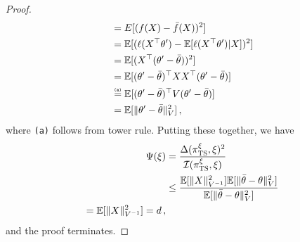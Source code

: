 \documentclass[letter, 12pt]{report}
\newcommand{\explan}[1]{\stackrel{\text{\tiny \texttt{#1}}}}
\newcommand{\E}{\mathbb E}
\newcommand{\I}{\mathcal{I}}
\newcommand{\1}{\mathbf{1}}
\newcommand{\ts}{\textsc{TS}\xspace}
\theoremstyle{plain}
\theoremstyle{definition}
\theoremstyle{remark}
\begin{document}
\begin{proof}
\begin{align*}
         & =
        E[(f(X) - \bar{f}(X))^2]                                            \\
         & =
        \E[(\ell(X^\top \theta') - \E[\ell(X^\top \theta')|X])^2]           \\
         & =
        \E[(X^\top (\theta' - \bar{\theta}))^2]                             \\
         & =
        \E[(\theta' - \bar{\theta})^\top X X^\top (\theta' - \bar{\theta})] \\
         &
        \explan{(a)}
        =
        \E[(\theta' - \bar{\theta})^\top V (\theta' - \bar{\theta})]        \\
         & =
        \E[\|\theta' - \bar{\theta}\|_V^2]\,,
    \end{align*}
    where \texttt{(a)} follows from tower rule.
    Putting these together, we have
    \begin{align*}
        \Psi(\xi)
         & =
        \frac{\Delta(\pi^\xi_\ts, \xi)^2}{\I(\pi^\xi_\ts, \xi)}
        \\
         & \leq
        \frac{
        \E[\|X\|^2_{V^{-1}}]
        \E[\|\bar{\theta} - \theta\|^2_{V}]
        }{
        \E[\|\bar{\theta} - \theta\|^2_{V}]
        }
        \\
        =
        \E[\|X\|^2_{V^{-1}}]
        =d\,,
    \end{align*}
    and the proof terminates.
\end{proof}
\end{document}
